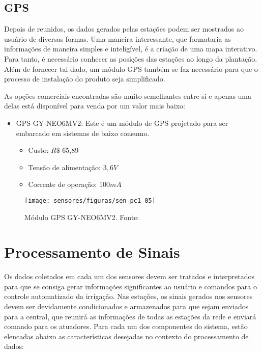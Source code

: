 	\subsection{GPS}
	Depois de reunidos, os dados gerados pelas estações podem ser mostrados ao usuário de diversas formas. Uma maneira interessante, que formataria as informações de maneira simples e inteligível, é a criação de uma mapa interativo. Para tanto, é necessário conhecer as posições das estações ao longo da plantação. Além de fornecer tal dado, um módulo GPS também se faz necessário para que o processo de instalação do produto seja simplificado.
	
	As opções comerciais encontradas são muito semelhantes entre si e apenas uma delas está disponível para venda por um valor mais baixo:	
	
	\begin{itemize}
		\item GPS GY-NEO6MV2: Este é um módulo de GPS projetado para ser embarcado em sistemas de baixo consumo.
			\begin{itemize}
				\item Custo: $R\$$ 65,89
				\item Tensão de alimentação: $3,6V$
				\item Corrente de operação: $100 mA$
			\end{itemize}
	\end{itemize}
	
\begin{figure}[H]
	\centering
	\texttt{[image: sensores/figuras/sen\_pc1\_05]}
	\caption{Módulo GPS GY-NEO6MV2. Fonte: \cite{bib_sen_pc1_10}}
\end{figure}	

	
	
\section{Processamento de Sinais}
	Os dados coletados em cada um dos sensores devem ser tratados e interpretados para que se consiga gerar informações significantes ao usuário e comandos para o controle automatizado da irrigação. Nas estações, os sinais gerados nos sensores devem ser devidamente condicionados e armazenados para que sejam enviados para a central, que reunirá as informações de todas as estações da rede e enviará comando para os atuadores. Para cada um dos componentes do sistema, estão elencadas abaixo as características desejadas no contexto do processamento de dados:
	
